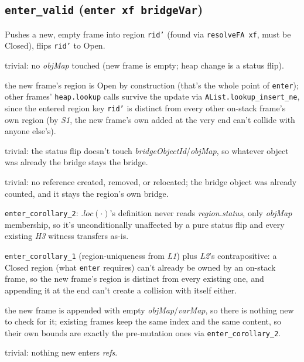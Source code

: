 \documentclass[11pt]{article}
\newcommand{\op}[1]{\texttt{#1}}
\newcommand{\thm}[1]{\textbf{\texttt{#1}}}
\begin{document}
\subsection{\thm{enter\_valid} (\op{enter xf bridgeVar})}
Pushes a new, empty frame into region \op{rid'} (found via \op{resolveFA xf}, must be Closed),
flips \op{rid'} to Open.
\begin{description}[nosep]
  \item[L1] trivial: no \textit{objMap} touched (new frame is empty; heap change is a status flip).
  \item[L2] the new frame's region is Open by construction (that's the whole point of
    \op{enter}); other frames' \texttt{heap.lookup} calls survive the update via
    \texttt{AList.lookup\_insert\_ne}, since the entered region key \op{rid'} is distinct from
    every other on-stack frame's own region (by \textit{S1}, the new frame's own added at the very
    end can't collide with anyone else's).
  \item[H1] trivial: the status flip doesn't touch \textit{bridgeObjectId}/\textit{objMap}, so
    whatever object was already the bridge stays the bridge.
  \item[H2] trivial: no reference created, removed, or relocated; the bridge object was already
    counted, and it stays the region's own bridge.
  \item[H3] \texttt{enter\_corollary\_2}: $.loc(\cdot)$'s definition never reads
    \textit{region.status}, only \textit{objMap} membership, so it's unconditionally unaffected by
    a pure status flip and every existing \textit{H3} witness transfers as-is.
  \item[S1] \texttt{enter\_corollary\_1} (region-uniqueness from \textit{L1}) plus \textit{L2}'s
    contrapositive: a Closed region (what \op{enter} requires) can't already be owned by an
    on-stack frame, so the new frame's region is distinct from every existing one, and appending it
    at the end can't create a collision with itself either.
  \item[S2, S3] the new frame is appended with empty \textit{objMap}/\textit{varMap}, so there is
    nothing new to check for it; existing frames keep the same index and the same content, so
    their own bounds are exactly the pre-mutation ones via \texttt{enter\_corollary\_2}.
  \item[HS1, HS2] trivial: nothing new enters \textit{refs}.
\end{description}
\end{document}
